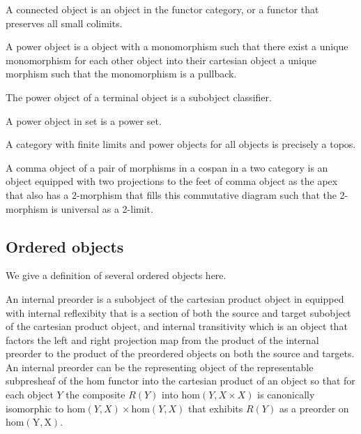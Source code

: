 \begin{definition}
    \label{definition-connected-object-functor}
    A connected object is an object in the functor category, or a functor that preserves all small colimits.
\end{definition}

\begin{definition}
    \label{definition-power-object}
    A power object is a object with a monomorphism such that there exist a unique monomorphism for each other object into their cartesian object a unique morphism such that the monomorphism is a pullback.
\end{definition}

\begin{definition}
    \label{definition-subobject-classifier}
    The power object of a terminal object is a subobject classifier.
\end{definition}

\begin{example}
    A power object in set is a power set.

    A category with finite limits and power objects for all objects is precisely a topos.
\end{example}

\begin{definition}
    \label{definition-comma-object}
    A comma object of a pair of morphisms in a cospan in a two category is an object equipped with two projections to the feet of comma object as the apex that also has a 2-morphism that fills this commutative diagram such that the 2-morphism is universal as a 2-limit.
\end{definition}

\subsection{Ordered objects}

We give a definition of several ordered objects here.

\begin{definition}
    \label{definition-internal-preorder}
    An internal preorder is a subobject of the cartesian product object in equipped with internal reflexibity that is a section of both the source and target subobject of the cartesian product object, and internal transitivity which is an object that factors the left and right projection map from the product of the internal preorder to the product of the preordered objects on both the source and targets. An internal preorder can be the representing object of the representable subpresheaf of the hom functor into the cartesian product of an object so that for each object $Y$ the composite $R(Y)$ into $\mathrm{hom}(Y, X \times X)$ is canonically isomorphic to $\mathrm{hom}(Y,X) \times \mathrm{hom}(Y,X)$ that exhibits $R(Y)$ as a preorder on $\mathrm{hom(Y,X)}$.
\end{definition}

